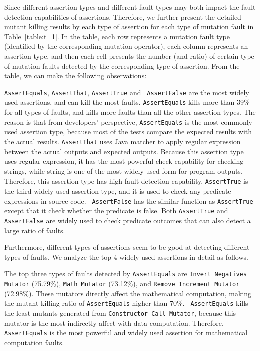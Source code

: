 Since different assertion types and different fault types may both
impact the fault detection capabilities of assertions. Therefore, we
further present the detailed mutant killing results by each type of
assertion for each type of mutation fault in
Table~\ref{table:t_1}. In the table, each row represents a
mutation fault type (identified by the corresponding mutation
operator), each column represents an assertion type, and then each
cell presents the number (and ratio) of certain type of mutation
faults detected by the corresponding type of assertion. From the
table, we can make the following observations:

{\tt AssertEquals}, {\tt AssertThat}, {\tt AssertTrue} and {\tt
AssertFalse} are the most widely used assertions, and can kill the
most faults. {\tt AssertEquals} kills more than 39\% for all types of
faults, and kills more faults than all the other assertion types.  The
reason is that from developers' perspective, {\tt AssertEquals} is the
most commonly used assertion type, because most of the tests compare
the expected results with the actual results.  {\tt AssertThat} uses
Java matcher to apply regular expression between the actual outputs
and expected outputs.  Because this assertion type uses regular
expression, it has the most powerful check capability for checking
strings, while string is one of the most widely used form for program
outputs. Therefore, this assertion type has high fault detection
capability. {\tt AssertTrue} is the third widely used assertion type,
and it is used to check any predicate expressions in source code. {\tt
AssertFalse} has the similar function as {\tt AssertTrue} except that
it check whether the predicate is false. Both {\tt AssertTrue} and
{\tt AssertFalse} are widely used to check predicate outcomes that can
also detect a large ratio of faults.

Furthermore, different types of assertions seem to be good at detecting
different types of faults. We analyze the top 4 widely used assertions
in detail as follows.

 The top three types of faults detected by {\tt AssertEquals}
are {\tt Invert Negatives Mutator} (75.79\%), {\tt Math Mutator}
(73.12\%), and {\tt Remove Increment Mutator} (72.98\%). These
mutators directly affect the mathematical computation, making the
mutant killing ratio of {\tt AssertEquals} higher than 70\%.  {\tt
AssertEquals} kills the least mutants generated from {\tt Constructor
Call Mutator}, because this mutator is the most indirectly affect with
data computation.  Therefore, {\tt AssertEquals} is the most powerful
and widely used assertion for mathematical computation faults.

